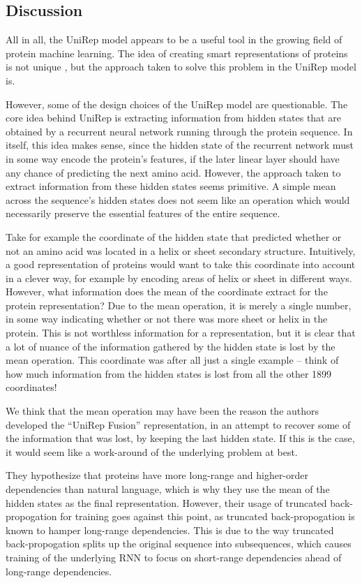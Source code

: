 \documentclass[a4paper,12pt]{article}
\begin{document}
\subsection{Discussion}
All in all, the UniRep model appears to be a useful tool in the growing field of protein machine learning. The idea of creating smart representations of proteins is not unique , but the approach taken to solve this problem in the UniRep model is.

However, some of the design choices of the UniRep model are questionable. The core idea behind UniRep is extracting information from hidden states that are obtained by a recurrent neural network running through the protein sequence. In itself, this idea makes sense, since the hidden state of the recurrent network must in some way encode the protein's features, if the later linear layer should have any chance of predicting the next amino acid. However, the approach taken to extract information from these hidden states seems primitive. A simple mean across the sequence's hidden states does not seem like an operation which would necessarily preserve the essential features of the entire sequence.

Take for example the coordinate of the hidden state that predicted whether or not an amino acid was located in a helix or sheet secondary structure. Intuitively, a good representation of proteins would want to take this coordinate into account in a clever way, for example by encoding areas of helix or sheet in different ways. However, what information does the mean of the coordinate extract for the protein representation? Due to the mean operation, it is merely a single number, in some way indicating whether or not there was more sheet or helix in the protein. This is not worthless information for a representation, but it is clear that a lot of nuance of the information gathered by the hidden state is lost by the mean operation. This coordinate was after all just a single example -- think of how much information from the hidden states is lost from all the other 1899 coordinates!

We think that the mean operation may have been the reason the authors developed the ``UniRep Fusion'' representation, in an attempt to recover some of the information that was lost, by keeping the last hidden state. If this is the case, it would seem like a work-around of the underlying problem at best.

They hypothesize that proteins have more long-range and higher-order dependencies than natural language, which is why they use the mean of the hidden states as the final representation. However, their usage of truncated back-propogation for training goes against this point, as truncated back-propogation is known to hamper long-range dependencies. This is due to the way truncated back-propogation splits up the original sequence into subsequences, which causes training of the underlying RNN to focus on short-range dependencies ahead of long-range dependencies.
\end{document}
